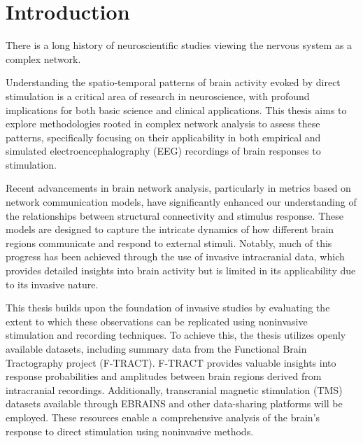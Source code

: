 \chapter*{Introduction}

There is a long history of neuroscientific studies viewing the nervous system as a complex network.\cite{sporns_structure_2013} \TODO[dokončit]


Understanding the spatio-temporal patterns of brain activity evoked by direct stimulation is a critical area of research in neuroscience, with profound implications for both basic science and clinical applications. This thesis aims to explore methodologies rooted in complex network analysis to assess these patterns, specifically focusing on their applicability in both empirical and simulated electroencephalography (EEG) recordings of brain responses to stimulation.

Recent advancements in brain network analysis, particularly in metrics based on network communication models, have significantly enhanced our understanding of the relationships between structural connectivity and stimulus response. These models are designed to capture the intricate dynamics of how different brain regions communicate and respond to external stimuli. Notably, much of this progress has been achieved through the use of invasive intracranial data, which provides detailed insights into brain activity but is limited in its applicability due to its invasive nature.

This thesis builds upon the foundation of invasive studies by evaluating the extent to which these observations can be replicated using noninvasive stimulation and recording techniques. To achieve this, the thesis utilizes openly available datasets, including summary data from the Functional Brain Tractography project (F-TRACT). F-TRACT provides valuable insights into response probabilities and amplitudes between brain regions derived from intracranial recordings. Additionally, transcranial magnetic stimulation (TMS) datasets available through EBRAINS and other data-sharing platforms will be employed. These resources enable a comprehensive analysis of the brain’s response to direct stimulation using noninvasive methods.

